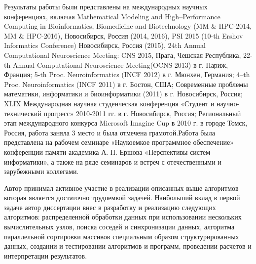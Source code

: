 {\probation}
Результаты работы были представлены на международных научных конференциях, включая Mathematical Modeling and High--Performance Computing in Bioinformatics, Biomedicine and Biotechnology (MM \& HPC-2014, MM \& HPC-2016), Новосибирск, Россия (2014, 2016), PSI 2015 (10-th Ershov Informatics Conference) Новосибирск, Россия (2015), 24th Annual Computational Neuroscience Meeting: CNS 2015, Прага, Чешская Республика, 22-th Annual Computational Neuroscience Meeting(OCNS 2013) в г. Париж, Франция; 5-th Proc. Neuroinformatics (INCF 2012) в г. Мюнхен, Германия; 4--th Proc. Neuroinformatics (INCF 2011) в г. Бостон, США; Современные проблемы математики, информатики и биоинформатики (2011) в г. Новосибирск, Россия; XLIX Международная научная студенческая конференция
«Студент и научно-технический прогресс» 2010-2011 гг. в г. Новосибирск, Россия; Региональный этап международного конкурса Microsoft Imagine Cup в 2010 г. в городе Томск, Россия, работа заняла 3 место и была отмечена грамотой.Работа была представлена на рабочем семинаре «Наукоемкое программное обеспечение» конференции памяти академика А. П. Ершова «Перспективы систем информатики»,  а также на ряде семинаров и встреч с отечественными и зарубежными коллегами.

{\contribution} Автор принимал активное участие в реализации описанных выше алгоритмов которая является достаточно трудоемкой задачей. Наибольший вклад в первой задаче автор диссертации внес в разработку и реализацию следующих алгоритмов: распределенной обработки данных при использовании нескольких вычислительных узлов, поиска соседей и синхронизации данных, алгоритма параллельной сортировки массивов специальным образом структурированных данных, создании и тестировании алгоритмов и программ, проведении расчетов и интерпретации результатов.


